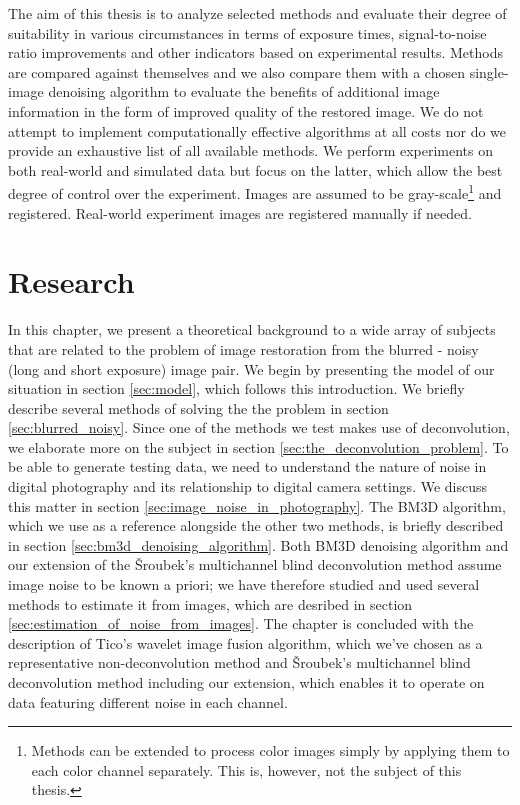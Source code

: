 \documentclass[12pt,notitlepage]{report}
\begin{document}
The aim of this thesis is to analyze selected methods and evaluate their degree of suitability in various circumstances in terms of exposure times, signal-to-noise ratio improvements and other indicators based on experimental results. Methods are compared against themselves and we also compare them with a chosen single-image denoising algorithm to evaluate the benefits of additional image information in the form of improved quality of the restored image. We do not attempt to implement computationally effective algorithms at all costs nor do we provide an exhaustive list of all available methods. We perform experiments on both real-world and simulated data but focus on the latter, which allow the best degree of control over the experiment. Images are assumed to be gray-scale\footnote[2]{Methods can be extended to process color images simply by applying them to each color channel separately. This is, however, not the subject of this thesis.} and registered. Real-world experiment images are registered manually if needed.

\clearpage

\chapter{Research}
\label{chap:research}

In this chapter, we present a theoretical background to a wide array of subjects that are related to the problem of image restoration from the blurred - noisy (long and short exposure) image pair. We begin by presenting the model of our situation in section \ref{sec:model}, which follows this introduction. We briefly describe several methods of solving the the problem in section \ref{sec:blurred_noisy}. Since one of the methods we test makes use of deconvolution, we elaborate more on the subject in section \ref{sec:the_deconvolution_problem}. To be able to generate testing data, we need to understand the nature of noise in digital photography and its relationship to digital camera settings. We discuss this matter in section  \ref{sec:image_noise_in_photography}. The BM3D algorithm, which we use as a reference alongside the other two methods, is briefly described in section \ref{sec:bm3d_denoising_algorithm}. Both BM3D denoising algorithm and our extension of the Šroubek's multichannel blind deconvolution method assume image noise to be known a priori; we have therefore studied and used several methods to estimate it from images, which are desribed in section \ref{sec:estimation_of_noise_from_images}. The chapter is concluded with the description of Tico's wavelet image fusion algorithm, which we've chosen as a representative non-deconvolution method and Šroubek's multichannel blind deconvolution method including our extension, which enables it to operate on data featuring different noise in each channel.    
\end{document}
